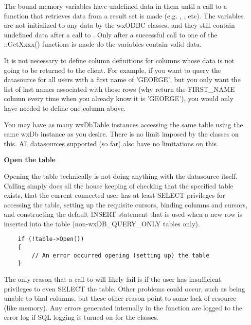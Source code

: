 The bound memory variables have undefined data in them until a call to a 
function that retrieves data from a result set is made 
(e.g. ,
, etc).  The variables are not 
initialized to any data by the wxODBC classes, and they still contain 
undefined data after a call to .  Only 
after a successful call to one of the ::GetXxxx() functions is made do the 
variables contain valid data.

It is not necessary to define column definitions for columns whose data is 
not going to be returned to the client.  For example, if you want to query 
the datasource for all users with a first name of 'GEORGE', but you only want 
the list of last names associated with those rows (why return the FIRST\_NAME 
column every time when you already know it is 'GEORGE'), you would only have 
needed to define one column above.

You may have as many wxDbTable instances accessing the same table using the 
same wxDb instance as you desire.  There is no limit imposed by the classes 
on this.  All datasources supported (so far) also have no limitations on this.


{\bf Open the table}

Opening the table technically is not doing anything with the datasource 
itself.  Calling  simply does all the 
house keeping of checking that the specified table exists, that the current 
connected user has at least SELECT privileges for accessing the table, 
setting up the requisite cursors,  binding columns and cursors, and 
constructing the default INSERT statement that is used when a new row is 
inserted into the table (non-wxDB\_QUERY\_ONLY tables only).

\begin{verbatim}
    if (!table->Open())
    {
        // An error occurred opening (setting up) the table
    }
\end{verbatim}

The only reason that a call to  will likely fail is if the 
user has insufficient privileges to even SELECT the table.  Other problems 
could occur, such as being unable to bind columns, but these other reason 
point to some lack of resource (like memory).  Any errors generated 
internally in the  function are logged to the error log 
if SQL logging is turned on for the classes.


